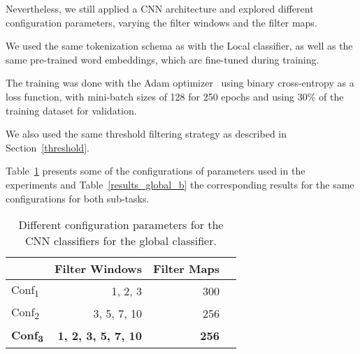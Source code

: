 \documentclass[11pt,a4paper]{article}
\begin{document}
Nevertheless, we still applied a CNN architecture and explored different
configuration parameters, varying the filter windows and the filter maps.

We used the same tokenization schema as with the Local classifier, as well
as the same pre-trained word embeddings, which are fine-tuned during training.

The training was done with the Adam optimizer~\cite{journals/corr/KingmaB14}
using binary cross-entropy as a loss function, with mini-batch sizes of 128 for
250 epochs and using 30\% of the training dataset for validation.

We also used the same threshold filtering strategy as described in Section~\ref{threshold}.

Table~\ref{subtask_b_parameters_global} presents some of the configurations of
parameters used in the experiments and Table~\ref{results_global_b} the
corresponding results for the same configurations for both sub-tasks.

\begin{table}[!h]
\begin{center}
\begin{tabular}{|l|r|r|r|}
\hline\centering\textbf{}  & \textbf{Filter Windows} &  \textbf{Filter Maps} \\
\hline
Conf\textsubscript{1} &           1, 2, 3  &  300 \\
Conf\textsubscript{2} &        3, 5, 7, 10 &  256 \\
\textbf{Conf\textsubscript{3}} &  \textbf{1, 2, 3, 5, 7, 10} &  \textbf{256} \\
\hline
\end{tabular}
\end{center}
\caption{\label{subtask_b_parameters_global} Different configuration parameters
for the CNN classifiers for the global classifier.}
\end{table}
\end{document}
